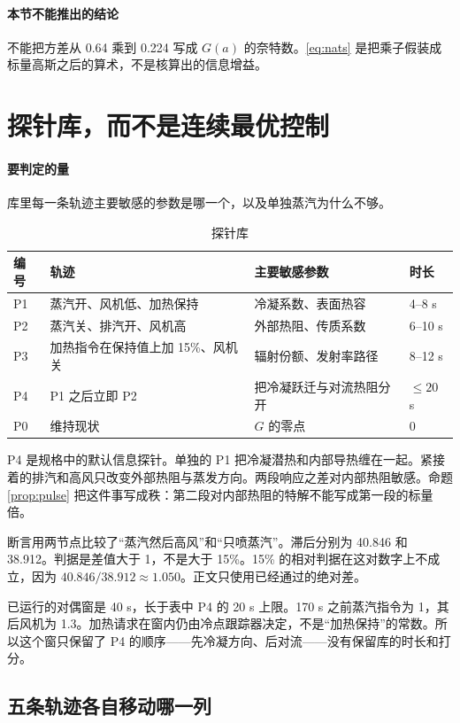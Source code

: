 \paragraph{本节不能推出的结论}
不能把方差从 0.64 乘到 0.224 写成 \(G(a)\) 的奈特数。\eqref{eq:nats} 是把乘子假装成标量高斯之后的算术，不是核算出的信息增益。

\section{探针库，而不是连续最优控制}

\paragraph{要判定的量}
库里每一条轨迹主要敏感的参数是哪一个，以及单独蒸汽为什么不够。

\begin{table}[ht]
\centering
\caption{探针库}
\begin{tabularx}{\textwidth}{lXll}
\toprule
编号 & 轨迹 & 主要敏感参数 & 时长 \\
\midrule
P1 & 蒸汽开、风机低、加热保持 & 冷凝系数、表面热容 & 4--8 s \\
P2 & 蒸汽关、排汽开、风机高 & 外部热阻、传质系数 & 6--10 s \\
P3 & 加热指令在保持值上加 15\%、风机关 & 辐射份额、发射率路径 & 8--12 s \\
P4 & P1 之后立即 P2 & 把冷凝跃迁与对流热阻分开 & \(\le 20\) s \\
P0 & 维持现状 & \(G\) 的零点 & 0 \\
\bottomrule
\end{tabularx}
\end{table}

P4 是规格中的默认信息探针。单独的 P1 把冷凝潜热和内部导热缠在一起。紧接着的排汽和高风只改变外部热阻与蒸发方向。两段响应之差对内部热阻敏感。命题 \ref{prop:pulse} 把这件事写成秩：第二段对内部热阻的特解不能写成第一段的标量倍。

断言用两节点比较了“蒸汽然后高风”和“只喷蒸汽”。滞后分别为 40.846 和 38.912。判据是差值大于 1，不是大于 15\%。15\% 的相对判据在这对数字上不成立，因为 \(40.846/38.912\approx 1.050\)。正文只使用已经通过的绝对差。

已运行的对偶窗是 40 s，长于表中 P4 的 20 s 上限。170 s 之前蒸汽指令为 1，其后风机为 1.3。加热请求在窗内仍由冷点跟踪器决定，不是“加热保持”的常数。所以这个窗只保留了 P4 的顺序——先冷凝方向、后对流——没有保留库的时长和打分。

\subsection{五条轨迹各自移动哪一列}

